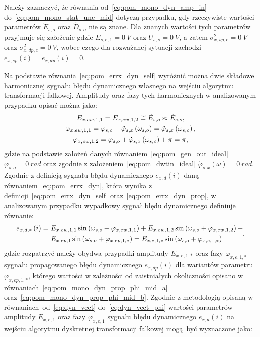 Należy zaznaczyć, że równania od~\eqref{eq:pom_mono_dyn_amp_in} do~\eqref{eq:pom_mono_stat_unc_mid} dotyczą przypadku, gdy rzeczywiste wartości parametrów $\tilde{E}_{s,o}$ oraz $\tilde{D}_{s,o}$ nie są znane. Dla znanych wartości tych parametrów przyjmuje się założenie gdzie $E_{s,e,1} = \qty{0}{V}$ oraz $U_{s,s} = \qty{0}{V}$, a zatem $\sigma_{x,sp,c}^{2} = \qty{0}{V}$ oraz $\sigma_{x,dp,c}^{2} = \qty{0}{V}$, wobec czego dla rozważanej sytuacji zachodzi $e_{x,sp}(i) = e_{x,dp}(i) = 0$.

Na podstawie równania~\eqref{eq:pom_errx_dyn_self} wyróżnić można dwie składowe harmonicznej sygnału błędu dynamicznego własnego na wejściu algorytmu transformacji falkowej. Amplitudy oraz fazy tych harmonicznych w analizowanym przypadku opisać można jako:
\begin{gather}
E_{x,ew,1,1} = E_{x,ew,1,2} \cong \tilde{E}_{s,o} \approx \dot{E}_{s,o} \label{eq:pom_mono_dyn_self_amp_mid}, \\
\varphi_{x,ew,1,1} = \varphi_{s,o} + \tilde{\varphi}_{s,x} \left(\omega_{s,o}\right) = \tilde{\varphi}_{s,x} \left(\omega_{s,o}\right) \label{eq:pom_mono_dyn_self_phi_mid_1}, \\
\varphi_{x,ew,1,2} = \varphi_{s,o} + \dot{\varphi}_{s,x} \left(\omega_{s,o}\right) + \pi = \pi \label{eq:pom_mono_dyn_self_phi_mid_2},
\end{gather}
gdzie na podstawie założeń danych równaniem~\eqref{eq:pom_gen_out_ideal} $\varphi_{s,o} = \qty{0}{rad}$ oraz zgodnie z założeniem~\eqref{eq:pom_dwtin_ideal} $\dot{\varphi}_{s,x}(\omega) = \qty{0}{rad}$. Zgodnie z definicją sygnału błędu dynamicznego $e_{x,d}(i)$ daną równaniem~\eqref{eq:pom_errx_dyn}, która wynika z definicji~\eqref{eq:pom_errx_dyn_self} oraz~\eqref{eq:pom_errx_dyn_prop}, w analizowanym przypadku wypadkowy sygnał błędu dynamicznego definiuje równanie:
\begin{equation}
\begin{split}
e_{x,d,*} \left(i\right) =~
& E_{x,ew,1,1} \sin \left(\omega_{s,o} + \varphi_{x,ew,1,1}\right) + E_{x,ew,1,2} \sin \left(\omega_{s,o} + \varphi_{x,ew,1,2}\right) + \\
& E_{x,ep,1} \sin \left(\omega_{s,o} + \varphi_{x,ep,1,*}\right) = E_{x,e,1,*} \sin \left(\omega_{s,o} + \varphi_{x,e,1,*}\right)
\end{split}
\label{eq:pom_mono_dyn_sum_err_mid},
\end{equation}
gdzie rozpatrzyć należy obydwa przypadki amplitudy $E_{x,e,1,*}$ oraz fazy $\varphi_{x,e,1,*}$ sygnału propagowanego błędu dynamicznego $e_{x,dp}(i)$ dla wariantów parametru $\varphi_{x,ep,1,*}$, którego wartości w zależności od zaistniałych okoliczności opisano w równaniach~\eqref{eq:pom_mono_dyn_prop_phi_mid_a} oraz~\eqref{eq:pom_mono_dyn_prop_phi_mid_b}. Zgodnie z metodologią opisaną w równaniach~od~\eqref{eq:dyn_vect} do~\eqref{eq:dyn_vect_phi} wartości parametrów amplitudy $E_{x,e,1}$ oraz fazy $\varphi_{x,e,1}$ sygnału błędu dynamicznego $e_{x,d}(i)$ na wejściu algorytmu dyskretnej transformacji falkowej mogą być wyznaczone jako:
